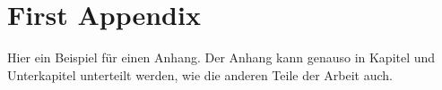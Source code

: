 \chapter{First Appendix}

Hier ein Beispiel für einen Anhang. Der Anhang kann genauso in Kapitel und Unterkapitel unterteilt werden, wie die anderen Teile der Arbeit auch.
